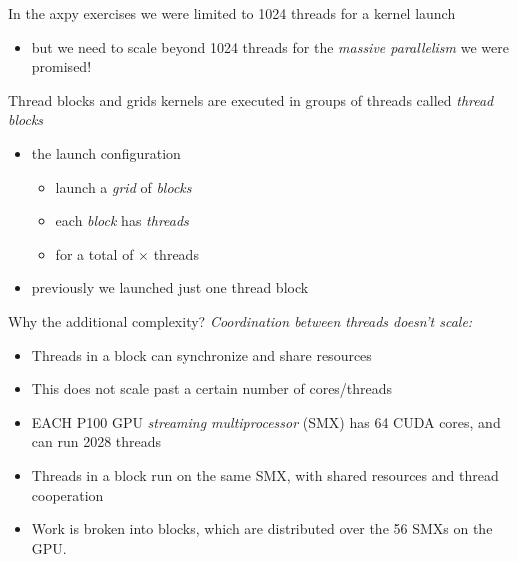 \documentclass[aspectratio=43]{beamer}
\newcommand{\axpy}{{\ttfamily axpy}\xspace}
\begin{document}
\begin{frame}[fragile]{}
    \begin{info}{}
        In the \axpy exercises we were limited to 1024 threads for a kernel launch
        \begin{itemize}
            \item but we need to scale beyond 1024 threads for the \emph{massive parallelism} we were promised!
        \end{itemize}
    \end{info}

    \begin{info}{Thread blocks and grids}
        kernels are executed in groups of threads called \emph{thread blocks}
        \vspace{-12pt}
        \begin{itemize}
            \item the launch configuration 
            \begin{itemize}
                \item launch a \emph{grid} of  \emph{blocks}
                \item each \emph{block} has  \emph{threads}
                \item for a total of $\times$ threads
            \end{itemize}
            \item previously we launched just one thread block 
        \end{itemize}
    \end{info}

\end{frame}

\begin{frame}[fragile]{Why the additional complexity?}
        \emph{Coordination between threads doesn't scale:}
        \begin{itemize}
            \item Threads in a block can synchronize and share resources
            \item This does not scale past a certain number of cores/threads
            \item EACH P100 GPU \emph{streaming multiprocessor} (SMX) has 64 CUDA cores, and can run 2028 threads
            \item Threads in a block run on the same SMX, with shared resources and thread cooperation
            \item Work is broken into blocks, which are distributed over the 56 SMXs on the GPU.
        \end{itemize}
\end{frame}
\end{document}
